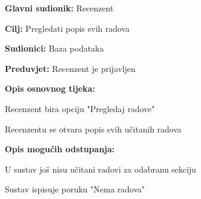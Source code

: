 	\noindent {}
	\begin{packed_item}
		
		\item \textbf{Glavni sudionik: }Recenzent
		\item  \textbf{Cilj:} Pregledati popis svih radova
		\item  \textbf{Sudionici:} Baza podataka
		\item  \textbf{Preduvjet:} Recenzent je prijavljen
		\item  \textbf{Opis osnovnog tijeka:}
		
		\item[] \begin{packed_enum}
			
			\item  Recenzent bira opciju "Pregledaj radove"
			\item Recenzentu se otvara popis svih učitanih radova
			
		\end{packed_enum}
		
		\item  \textbf{Opis mogućih odstupanja:}
		
		\item[] \begin{packed_item}
			
			\item[2.a] U sustav još nisu učitani radovi za odabranu sekciju
			\item[] \begin{packed_enum}
				
				\item Sustav ispisuje poruku "Nema radova"
				
			\end{packed_enum}
		\end{packed_item}
	\end{packed_item}

